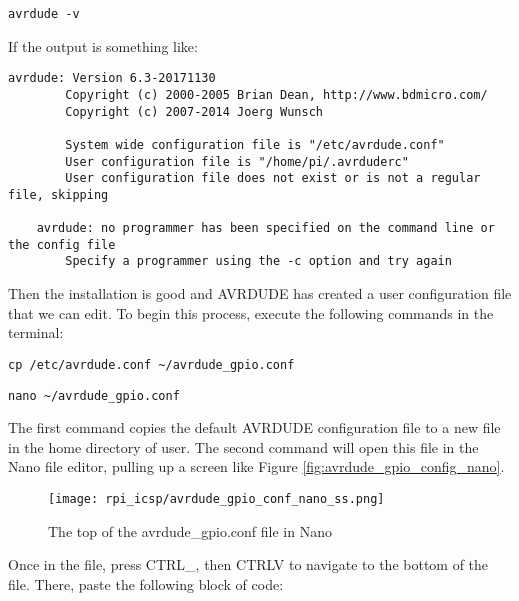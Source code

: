     \begin{lstlisting}[style=kaolstplain,linewidth=1.5\textwidth]
    avrdude -v
    \end{lstlisting}

    If the output is something like:

    \begin{lstlisting}[style=kaolstplain,linewidth=1.5\textwidth]
    avrdude: Version 6.3-20171130
        Copyright (c) 2000-2005 Brian Dean, http://www.bdmicro.com/
        Copyright (c) 2007-2014 Joerg Wunsch

        System wide configuration file is "/etc/avrdude.conf"
        User configuration file is "/home/pi/.avrduderc"
        User configuration file does not exist or is not a regular file, skipping

    avrdude: no programmer has been specified on the command line or the config file
        Specify a programmer using the -c option and try again
    \end{lstlisting}

    Then the installation is good and AVRDUDE has created a user configuration file that we can edit. To begin this process, execute the following commands in the terminal:

    \begin{lstlisting}[style=kaolstplain,linewidth=1.5\textwidth]
    cp /etc/avrdude.conf ~/avrdude_gpio.conf
    \end{lstlisting}

    \begin{lstlisting}[style=kaolstplain,linewidth=1.5\textwidth]
    nano ~/avrdude_gpio.conf
    \end{lstlisting}

    The first command copies the default AVRDUDE configuration file to a new file in the home directory of user. 
    The second command will open this file in the Nano file editor, pulling up a screen like Figure \ref{fig:avrdude_gpio_config_nano}.
    
    \begin{figure}[h!]
        \texttt{[image: rpi\_icsp/avrdude\_gpio\_conf\_nano\_ss.png]}
        \caption[AVRDUDE GPIO config file open in Nano]{The top of the avrdude\_gpio.conf file in Nano}
    \end{figure}

    Once in the file, press CTRL\+\_, then CTRL\+V to navigate to the bottom of the file. There, paste the following block of code:

